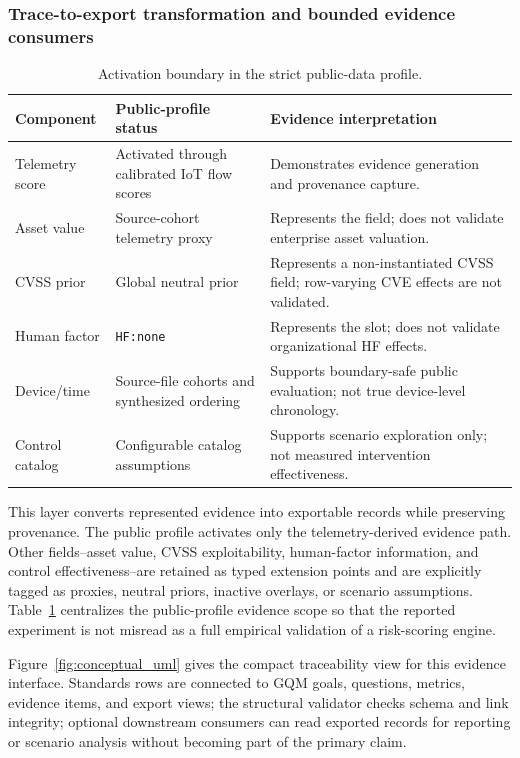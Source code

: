 \documentclass[12pt,a4paper]{article}
\begin{document}
\subsubsection{Trace-to-export transformation and bounded evidence consumers}
\label{sec:math_human}

\begin{table}[H]
\centering
\caption{Activation boundary in the strict public-data profile.}
\label{tab:risk_factor_activation}
\small
\setlength{\tabcolsep}{4pt}
\begin{tabularx}{\textwidth}{@{}p{}p{}X@{}}
\toprule
Component & Public-profile status & Evidence interpretation \\
\midrule
Telemetry score & Activated through calibrated IoT flow scores & Demonstrates evidence generation and provenance capture. \\
Asset value & Source-cohort telemetry proxy & Represents the field; does not validate enterprise asset valuation. \\
CVSS prior & Global neutral prior & Represents a non-instantiated CVSS field; row-varying CVE effects are not validated. \\
Human factor & \texttt{HF:none} & Represents the slot; does not validate organizational HF effects. \\
Device/time & Source-file cohorts and synthesized ordering & Supports boundary-safe public evaluation; not true device-level chronology. \\
Control catalog & Configurable catalog assumptions & Supports scenario exploration only; not measured intervention effectiveness. \\
\bottomrule
\end{tabularx}
\end{table}

This layer converts represented evidence into exportable records while preserving provenance. The public profile activates only the telemetry-derived evidence path. Other fields--asset value, CVSS exploitability, human-factor information, and control effectiveness--are retained as typed extension points and are explicitly tagged as proxies, neutral priors, inactive overlays, or scenario assumptions. Table~\ref{tab:risk_factor_activation} centralizes the public-profile evidence scope so that the reported experiment is not misread as a full empirical validation of a risk-scoring engine.

Figure~\ref{fig:conceptual_uml} gives the compact traceability view for this evidence interface. Standards rows are connected to GQM goals, questions, metrics, evidence items, and export views; the structural validator checks schema and link integrity; optional downstream consumers can read exported records for reporting or scenario analysis without becoming part of the primary claim.
\end{document}
